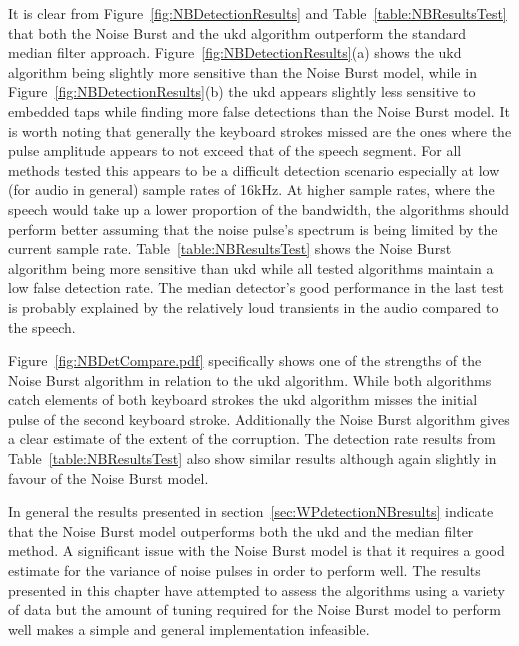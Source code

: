 \label{corrections:discuss_discrep}
It is clear from Figure~\ref{fig:NBDetectionResults} and Table~\ref{table:NBResultsTest} that both the Noise Burst and the \gls{ukd} algorithm outperform the standard median filter approach. Figure~\ref{fig:NBDetectionResults}(a) shows the \gls{ukd} algorithm being slightly more sensitive than the Noise Burst model, while in Figure~\ref{fig:NBDetectionResults}(b) the \gls{ukd} appears slightly less sensitive to embedded taps while finding more false detections than the Noise Burst model. It is worth noting that generally the keyboard strokes missed are the ones where the pulse amplitude appears to not exceed that of the speech segment. For all methods tested this appears to be a difficult detection scenario especially at low (for audio in general) sample rates of 16kHz. At higher sample rates, where the speech would take up a lower proportion of the bandwidth, the algorithms should perform better assuming that the noise pulse's spectrum is being limited by the current sample rate. Table~\ref{table:NBResultsTest} shows the Noise Burst algorithm being more sensitive than \gls{ukd} while all tested algorithms maintain a low false detection rate. The median detector's good performance in the last test is probably explained by the relatively loud transients in the audio compared to the speech.

Figure~\ref{fig:NBDetCompare.pdf} specifically shows one of the strengths of the Noise Burst algorithm in relation to the \gls{ukd} algorithm. While both algorithms catch elements of both keyboard strokes the \gls{ukd} algorithm misses the initial pulse of the second keyboard stroke. Additionally the Noise Burst algorithm gives a clear estimate of the extent of the corruption. The detection rate results from Table~\ref{table:NBResultsTest} also show similar results although again slightly in favour of the Noise Burst model.

In general the results presented in section~\ref{sec:WPdetectionNBresults} indicate that the Noise Burst model outperforms both the \gls{ukd} and the median filter method. A significant issue with the Noise Burst model is that it requires a good estimate for the variance of noise pulses in order to perform well. The results presented in this chapter have attempted to assess the algorithms using a variety of data but the amount of tuning required for the Noise Burst model to perform well makes a simple and general implementation infeasible.


